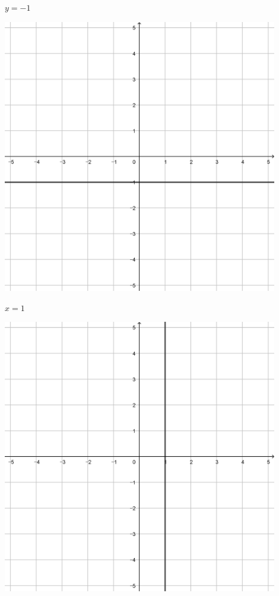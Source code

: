 \documentclass[a4paper]{oblivoir}
\begin{document}
\begin{minipage}{0.45\textwidth}\centering
\(y=-1\)
\par\bigskip\includegraphics[width=0.9\textwidth]{img/5-5}
\end{minipage}
\begin{minipage}{0.45\textwidth}\centering
\(x=1\)
\par\bigskip\includegraphics[width=0.9\textwidth]{img/5-6}
\end{minipage}\bigskip\bigskip\par
\end{document}

